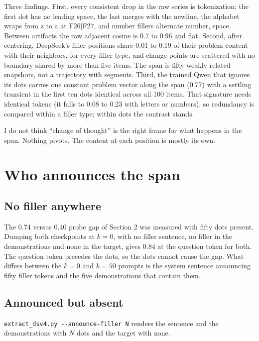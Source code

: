 \documentclass[11pt]{article}
\newcommand{\ttt}[1]{\texttt{\small #1}}
\begin{document}
Three findings. First, every consistent drop in the raw series is tokenization: the first dot has no leading space, the last merges with the newline, the alphabet wraps from z to a at F26$|$F27, and number fillers alternate number, space. Between artifacts the raw adjacent cosine is 0.7 to 0.96 and flat. Second, after centering, DeepSeek's filler positions share 0.01 to 0.19 of their problem content with their neighbors, for every filler type, and change points are scattered with no boundary shared by more than five items. The span is fifty weakly related snapshots, not a trajectory with segments. Third, the trained Qwen that ignores its dots carries one constant problem vector along the span (0.77) with a settling transient in the first ten dots identical across all 100 items. That signature needs identical tokens (it falls to 0.08 to 0.23 with letters or numbers), so redundancy is compared within a filler type; within dots the contrast stands.

I do not think ``change of thought'' is the right frame for what happens in the span. Nothing pivots. The content at each position is mostly its own.

\section{Who announces the span}

\subsection{No filler anywhere}

The 0.74 versus 0.40 probe gap of Section 2 was measured with fifty dots present. Dumping both checkpoints at $k=0$, with no filler sentence, no filler in the demonstrations and none in the target, gives 0.84 at the question token for both. The question token precedes the dots, so the dots cannot cause the gap. What differs between the $k=0$ and $k=50$ prompts is the system sentence announcing fifty filler tokens and the five demonstrations that contain them.

\subsection{Announced but absent}

\ttt{extract\_dsv4.py -{}-announce-filler N} renders the sentence and the demonstrations with $N$ dots and the target with none.
\end{document}
